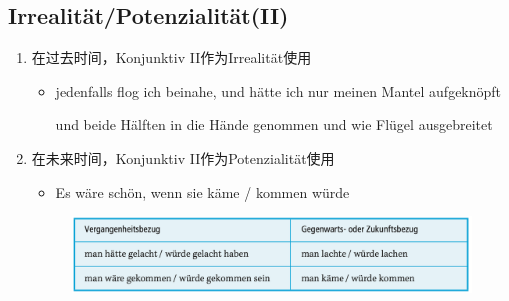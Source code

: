 \documentclass[UTF8]{report}
\begin{document}
\subsection{Irrealität/Potenzialität(II)}
\begin{enumerate}
    \item 在过去时间，Konjunktiv II作为Irrealität使用
    \begin{itemize}
        \item jedenfalls flog ich beinahe, und hätte ich nur meinen Mantel aufgeknöpft
        
        und beide Hälften in die Hände genommen und wie Flügel ausgebreitet
    \end{itemize}
    \item 在未来时间，Konjunktiv II作为Potenzialität使用
    \begin{itemize}
        \item Es wäre schön, wenn sie käme / kommen würde
    \end{itemize}
    \begin{figure}[H]
    \centering
    \includegraphics[scale=0.5]{gq.png}
    \end{figure}
\end{enumerate}
\end{document}
